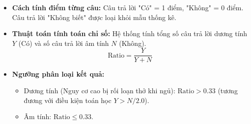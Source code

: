 \documentclass[12pt,a4paper]{article}
\begin{document}
\begin{itemize}
\begin{enumerate}
        \item Trẻ có thường cựa quậy tay chân hoặc đứng ngồi không yên không?
        \item Trẻ có hay ngắt lời hoặc chen ngang vào việc của người khác không?
        \item Con ông (bà) có thường 'quá hiếu động' hay thường 'hay nói quá nhiều'?
    \end{enumerate}
    \item \textbf{Cách tính điểm từng câu:} Câu trả lời "Có" = 1 điểm, "Không" = 0 điểm. Câu trả lời "Không biết" được loại khỏi mẫu thống kê.
    \item \textbf{Thuật toán tính toán chỉ số:}
    Hệ thống tính tổng số câu trả lời dương tính $Y$ (Có) và số câu trả lời âm tính $N$ (Không).
    \begin{equation}
        \text{Ratio} = \frac{Y}{Y + N}
    \end{equation}
    \item \textbf{Ngưỡng phân loại kết quả:}
    \begin{itemize}
        \item Dương tính (Nguy cơ cao bị rối loạn thở khi ngủ): $\text{Ratio} > 0.33$ (tương đương với điều kiện toán học $Y > N/2.0$).
        \item Âm tính: $\text{Ratio} \le 0.33$.
    \end{itemize}
\end{itemize}
\end{document}

